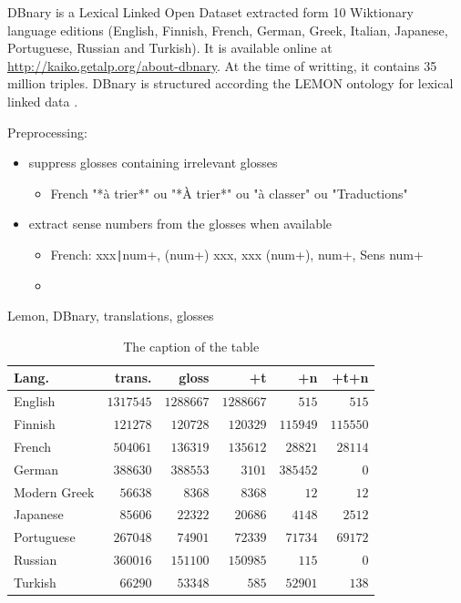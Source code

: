 \documentclass[10pt, a4paper]{article}
\begin{document}
DBnary is a Lexical Linked Open Dataset extracted form 10 Wiktionary language editions (English, Finnish, French, German, Greek, Italian, Japanese, Portuguese, Russian and Turkish). It is available online at \url{http://kaiko.getalp.org/about-dbnary}. At the time of writting, it contains 35 million triples. DBnary is structured according the LEMON ontology for lexical linked data \cite{DBLP:conf/esws/McCraeSC11}.



Preprocessing:

\begin{itemize}
   \item suppress glosses containing irrelevant glosses
   \begin{itemize}
      \item French "*à trier*" ou "*À trier*" ou "à classer" ou "Traductions"
   \end{itemize}
   \item extract sense numbers from the glosses when available
   \begin{itemize}
      \item French: xxx\texttt{|}num+, (num+) xxx, xxx (num+), num+, Sens num+
      \item 
   \end{itemize}
\end{itemize}
Lemon, DBnary, translations, glosses

\begin{table}[h]
\begin{center}\begin{footnotesize}
\begin{tabular}{lrrrrr}
\textbf{Lang.} & \textbf{trans.} & \textbf{gloss} & \textbf{+t} &  \textbf{+n} & \textbf{+t+n}\\
\hline
English & $1317545$ & $1288667$ & $1288667$ & $515$ & $515$ \\
Finnish & $121278$ & $120728$ & $120329$ & $115949$ & $115550$ \\
French & $504061$ & $136319$ & $135612$ & $28821$ & $28114$ \\
German & $388630$ & $388553$ & $3101$ & $385452$ & $0$ \\
Modern Greek & $56638$ & $8368$ & $8368$ & $12$ & $12$ \\
Japanese & $85606$ & $22322$ & $20686$ & $4148$ & $2512$ \\
Portuguese & $267048$ & $74901$ & $72339$ & $71734$ & $69172$ \\
Russian & $360016$ & $151100$ & $150985$ & $115$ & $0$ \\
Turkish & $66290$ & $53348$ & $585$ & $52901$ & $138$ \\
\hline
\end{tabular}
\caption{The caption of the table}
\end{footnotesize}\end{center}
\end{table}
\end{document}
